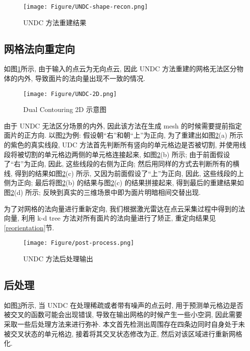 \begin{figure}[H]
	\center
	\texttt{[image: Figure/UNDC-shape-recon.png]}
	\centering
	\caption{UNDC 方法重建结果}\label{fig:fig-shape-recon}
\end{figure}

\subsection{网格法向重定向}

如图\ref{fig:fig-shape-recon}所示, 由于输入的点云为无向点云, 因此 UNDC 方法重建的网格无法区分物体的内外, 导致面片的法向量出现不一致的情况. 

\begin{figure}[H]
	\center
	\texttt{[image: Figure/UNDC-2D.png]}
	\centering
	\caption{Dual Contouring 2D 示意图}\label{fig:fig-2D-UNDC}
\end{figure}

由于 UNDC 无法区分场景的内外, 因此该方法在生成 mesh 的时候需要提前指定面片的正方向. 
以图\ref{fig:fig-2D-UNDC}为例: 假设朝“右”和朝“上”为正向, 为了重建出如图\ref{fig:fig-2D-UNDC}(a) 所示的紫色的真实线段, UDC 方法首先判断所有竖向的单元格边是否被切割, 并使用线段将被切割的单元格边两侧的单元格连接起来, 如图\ref{fig:fig-2D-UNDC}(b) 所示; 
由于前面假设了“右”为正向, 因此, 这些线段的右侧为正向; 
然后用同样的方式去判断所有的横线, 得到的结果如图\ref{fig:fig-2D-UNDC}(c) 所示, 又因为前面假设了“上”为正向, 因此, 这些线段的上侧为正向; 
最后将图\ref{fig:fig-2D-UNDC}(b) 的结果与图\ref{fig:fig-2D-UNDC}(c) 的结果拼接起来, 得到最后的重建结果如图\ref{fig:fig-2D-UNDC}(d) 所示; 
反映到真实的三维场景中即为面片明暗相间交替出现. 

为了对网格的法向量进行重新定向, 我们根据激光雷达在点云采集过程中得到的法向量, 利用 k-d tree 方法对所有面片的法向量进行了矫正, 重定向结果见\ref{reorientation}节. 

\begin{figure}[H]
	\center
	\texttt{[image: Figure/post-process.png]}
	\centering
	\caption{UNDC 方法后处理输出}\label{fig:fig-post}
\end{figure}

\subsection{后处理}

如图\ref{fig:fig-post}所示, 当 UNDC 在处理稀疏或者带有噪声的点云时, 用于预测单元格边是否被交叉的函数可能会出现错误, 导致在输出网格的时候产生一些小空洞, 因此需要采取一些后处理方法来进行弥补. 
本文首先检测出周围存在四条边同时自身处于未被交叉状态的单元格边, 接着将其交叉状态修改为正, 然后对该区域进行重新网格化. 

